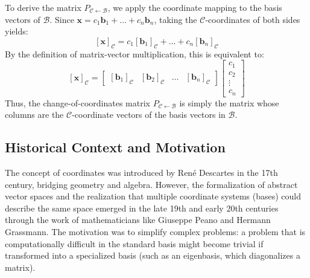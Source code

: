 \documentclass[11pt]{article}
\begin{document}
To derive the matrix $P_{\mathcal{C} \leftarrow \mathcal{B}}$, we apply the coordinate mapping to the basis vectors of $\mathcal{B}$. Since $\mathbf{x} = c_1\mathbf{b}_1 + \dots + c_n\mathbf{b}_n$, taking the $\mathcal{C}$-coordinates of both sides yields:
\[ [\mathbf{x}]_{\mathcal{C}} = c_1[\mathbf{b}_1]_{\mathcal{C}} + \dots + c_n[\mathbf{b}_n]_{\mathcal{C}} \]
By the definition of matrix-vector multiplication, this is equivalent to:
\[ [\mathbf{x}]_{\mathcal{C}} = \begin{bmatrix} [\mathbf{b}_1]_{\mathcal{C}} & [\mathbf{b}_2]_{\mathcal{C}} & \dots & [\mathbf{b}_n]_{\mathcal{C}} \end{bmatrix} \begin{bmatrix} c_1 \\ c_2 \\ \vdots \\ c_n \end{bmatrix} \]
Thus, the change-of-coordinates matrix $P_{\mathcal{C} \leftarrow \mathcal{B}}$ is simply the matrix whose columns are the $\mathcal{C}$-coordinate vectors of the basis vectors in $\mathcal{B}$.

\subsection{Historical Context and Motivation}
The concept of coordinates was introduced by René Descartes in the 17th century, bridging geometry and algebra. However, the formalization of abstract vector spaces and the realization that multiple coordinate systems (bases) could describe the same space emerged in the late 19th and early 20th centuries through the work of mathematicians like Giuseppe Peano and Hermann Grassmann. The motivation was to simplify complex problems: a problem that is computationally difficult in the standard basis might become trivial if transformed into a specialized basis (such as an eigenbasis, which diagonalizes a matrix).
\end{document}
